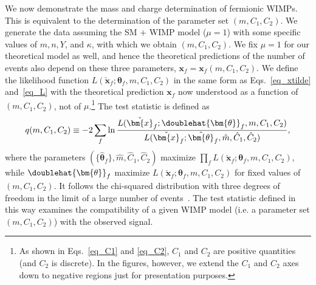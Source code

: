 \documentclass[12pt,twoside,book]{article}
\begin{document}
We now demonstrate the mass and charge determination of fermionic WIMPs.
This is equivalent to the determination of the parameter set $(m, C_1, C_2)$.
We generate the data assuming the SM $+$ WIMP model ($\mu=1$) with some specific values of $m, n, Y$, and $\kappa$, with which we obtain $(m, C_1, C_2)$.
We fix $\mu = 1$ for our theoretical model as well, and hence the theoretical predictions of the number of events also depend on these three parameters, $\bm{x}_f = \bm{x}_f (m, C_1, C_2)$.
We define the likelihood function $L(\check{\bm{x}}_f ; \bm{\theta}_f, m, C_1, C_2)$ in the same form as Eqs.~\eqref{eq_xtilde} and~\eqref{eq_L} with the theoretical prediction $\bm{x}_f$ now understood as a function of $(m, C_1, C_2)$, not of $\mu$.\footnote
{
  As shown in Eqs.\ \eqref{eq_C1} and \eqref{eq_C2}, $C_1$ and $C_2$ are positive quantities (and $C_2$ is discrete).
  In the figures, however, we extend the $C_1$ and $C_2$ axes down to negative regions just for presentation purposes.
}
The test statistic is defined as
\begin{align}
  q (m, C_1, C_2)
  \equiv -2 \sum_f \ln \frac
  {L(\check{\bm{x}}_f ; \doublehat{\bm{\theta}}_f, m, C_1, C_2)}
  {L(\check{\bm{x}}_f ; \hat{\bm{\theta}}_f, \hat{m}, \hat{C}_1, \hat{C}_2)},
  \label{eq_q0f}
\end{align}
where the parameters $(\{\hat{\bm{\theta}}_f\}, \hat{m}, \hat{C}_1, \hat{C}_2)$ maximize $\prod_f L(\check{\bm{x}}_f ; \bm{\theta}_f, m, C_1, C_2)$, while $\doublehat{\bm{\theta}}_f$ maximize
$L(\check{\bm{x}}_f ; \bm{\theta}_f, m, C_1, C_2)$ for fixed values of $(m, C_1, C_2)$.
It follows the chi-squared distribution with three degrees of freedom in the limit of a large number of events~\cite{Tanabashi:2018oca}.
The test statistic defined in this way examines the compatibility of a given WIMP model (i.e. a parameter set $(m, C_1, C_2)$) with the observed signal.
\end{document}
